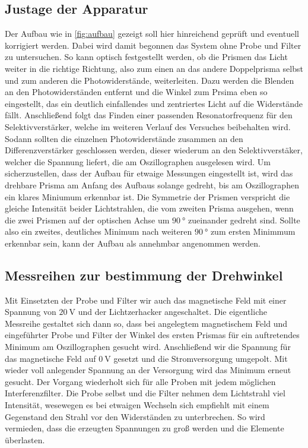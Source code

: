 \subsection{Justage der Apparatur}
Der Aufbau wie in \ref{fig:aufbau} gezeigt soll hier hinreichend geprüft und eventuell korrigiert werden.
Dabei wird damit begonnen das System ohne Probe und Filter zu untersuchen. So kann optisch festgestellt werden, 
ob die Prismen das Licht weiter in die richtige Richtung, also zum einen an das andere Doppelprisma selbst und zum anderen die Photowiderstände, weiterleiten.
Dazu werden die Blenden an den Photowiderständen entfernt und die Winkel zum Prsima eben so eingestellt, das
ein deutlich einfallendes und zentriertes Licht auf die Widerstände fällt.
Anschließend folgt das Finden einer passenden Resonatorfrequenz für den Selektivverstärker,
welche im weiteren Verlauf des Versuches beibehalten wird. Sodann sollten die einzelnen Photowiderstände zusammen 
an den Differenzverstärker geschlossen werden, dieser wiederum an den Selektivverstäker,
welcher die Spannung liefert, die am Oszillographen ausgelesen wird. 
Um sicherzustellen, dass der Aufbau für etwaige Messungen eingestellt ist, wird das drehbare Prisma am Anfang des 
Aufbaus solange gedreht, bis am Oszillographen ein klares Miniumum erkennbar ist. 
Die Symmetrie der Prismen verspricht die gleiche Intensität beider Lichtstrahlen, die vom zweiten 
Prisma ausgehen, wenn die zwei Prismen auf der optischen Achse um $\SI{90}{\degree}$
zueinander gedreht sind. Sollte also ein zweites, deutliches Minimum nach weiteren $\SI{90}{\degree}$ zum ersten Minimmum erkennbar sein, %
kann der Aufbau als annehmbar angenommen werden.

\subsection{Messreihen zur bestimmung der Drehwinkel}
Mit Einsetzten der Probe und Filter wir auch das magnetische Feld mit einer Spannung von
$\SI{20}{\volt}$ und der Lichtzerhacker angeschaltet. Die eigentliche Messreihe gestaltet sich dann so,
dass bei angelegtem magnetischem Feld und eingeführter Probe und Filter der Winkel des ersten Prismas
für ein auftretendes Minimum am Oszillographen gesucht wird. 
Anschließend wir die Spannung für das magnetische Feld auf $\SI{0}{\volt}$ gesetzt
und die Stromversorgung umgepolt. Mit wieder voll anlegender Spannung an der Versorgung wird das Minimum erneut gesucht.
Der Vorgang wiederholt sich für alle Proben mit jedem möglichen Interferenzfilter.
Die Probe selbst und die Filter nehmen dem Lichtstrahl viel Intensität, wesewegen es bei etwaigen 
Wechseln sich empfiehlt mit einem Gegenstand den Strahl vor den Widerständen zu unterbrechen.
So wird vermieden, dass die erzeugten Spannungen zu groß werden und die Elemente überlasten.

